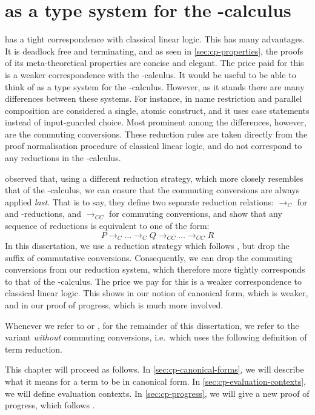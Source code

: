 \chapter{\cp as a type system for the \textpi-calculus}\label{sec:cppi}
\cp has a tight correspondence with classical linear logic.
This has many advantages.
It is deadlock free and terminating, and as seen in \cref{sec:cp-properties},
the proofs of its meta-theoretical properties are concise and elegant.
The price paid for this is a weaker correspondence with the \textpi-calculus.
It would be useful to be able to think of \cp as a type system for the
\textpi-calculus.
However, as it stands there are many differences between these systems.
For instance, in \cp name restriction and parallel composition are considered a
single, atomic construct, and it uses case statements instead of input-guarded
choice.
Most prominent among the differences, however, are the commuting conversions.
These reduction rules are taken directly from the proof normalisation procedure
of classical linear logic, and do not correspond to any reductions in the
\textpi-calculus. 

\textcite{lindley2015semantics} observed that, using a different reduction
strategy, which more closely resembles that of the \textpi-calculus, we can
ensure that the commuting conversions are always applied \emph{last}.
That is to say, they define two separate reduction relations:
$\longrightarrow_{C}$ for  and \textbeta-reductions,
and $\longrightarrow_{CC}$ for commuting conversions, and show that any
sequence of reductions is equivalent to one of the form:
\[
  P \longrightarrow_{C} \dots \longrightarrow_{C} Q \longrightarrow_{CC} \dots \longrightarrow_{CC} R
\]
In this dissertation, we use a reduction strategy which follows
\textcite{lindley2015semantics}, but drop the suffix of commutative
conversions.
Consequently, we can drop the commuting conversions from our reduction system,
which therefore more tightly corresponds to that of the \textpi-calculus.
The price we pay for this is a weaker correspondence to classical linear logic.
This shows in our notion of canonical form, which is weaker, and in our proof of
progress, which is much more involved.

Whenever we refer to \cp or \rcp, for the remainder of this dissertation, we
refer to the variant \emph{without} commuting conversions, i.e.\ which uses
the following definition of term reduction.


This chapter will proceed as follows.
In \cref{sec:cp-canonical-forms}, we will describe what it means for a term to
be in canonical form.
In \cref{sec:cp-evaluation-contexts}, we will define evaluation contexts.
In \cref{sec:cp-progress}, we will give a new proof of progress, which follows
\textcite{lindley2015semantics}.

